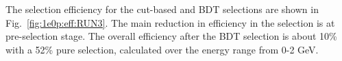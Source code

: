 The selection efficiency for the \zpsel cut-based and BDT selections are shown in Fig.~\ref{fig:1e0p:eff:RUN3}.  The main reduction in efficiency in the selection is at pre-selection stage.  The overall efficiency after the BDT selection is about 10\% with a 52\% pure selection, calculated over the energy range from 0-2 GeV.